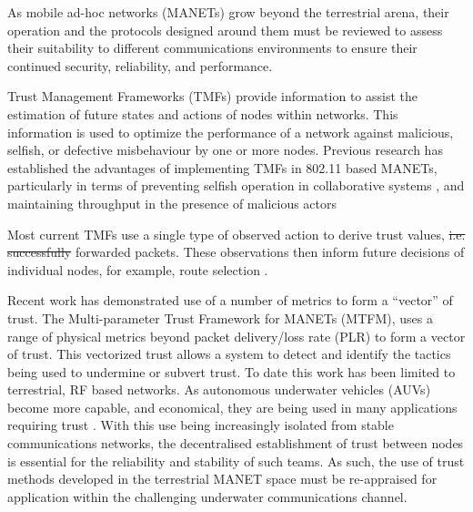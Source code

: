 \documentclass[conference]{IEEEtran}
\providecommand{\DIFadd}[1]{{\protect\color{blue}\uwave{#1}}} %
\providecommand{\DIFdel}[1]{{\protect\color{red}\sout{#1}}}                      %
\providecommand{\DIFaddbegin}{} %
\providecommand{\DIFaddend}{} %
\providecommand{\DIFdelbegin}{} %
\providecommand{\DIFdelend}{} %
\begin{document}
As mobile ad-hoc networks (MANETs) grow beyond the terrestrial arena, their operation and the protocols designed around them must be reviewed to assess their suitability to different communications environments to ensure their continued security, reliability, and performance.

\DIFaddbegin {}

\DIFaddend Trust Management Frameworks (TMFs) provide information to assist the estimation of future states and actions of nodes within networks.
This information is used to optimize the performance of a network against malicious, selfish, or defective misbehaviour by one or more nodes.
Previous research has established the advantages of implementing TMFs in 802.11 based MANETs, particularly in terms of preventing selfish operation in collaborative systems \cite{Li2007}, and maintaining throughput in the presence of malicious actors \cite{Buchegger2002}

Most current TMFs use a single type of observed action to derive trust values, \DIFdelbegin \DIFdel{i.e. successfully }\DIFdelend \DIFaddbegin \DIFadd{typically successfully delivered or }\DIFaddend forwarded packets. 
These observations then inform future decisions of individual nodes, for example, route selection \cite{Li2008}.

Recent work has demonstrated use of a number of metrics to form a ``vector'' of trust.
The Multi-parameter Trust Framework for MANETs (MTFM)\cite{Guo11}, uses a range of physical metrics beyond packet delivery/loss rate (PLR) to form a vector of trust.
This vectorized trust allows a system to detect and identify the tactics being used to undermine or subvert trust.
To date this work has been limited to terrestrial, RF based networks. 
As autonomous underwater vehicles (AUVs) become more capable, and economical, they are being used in many applications requiring trust \cite{Caiti2011}.
With this use being increasingly isolated from stable communications networks, the decentralised establishment of trust between nodes is essential for the reliability and stability of such teams.
As such, the use of trust methods developed in the terrestrial MANET space must be re-appraised for application within the challenging underwater communications channel.
\end{document}
